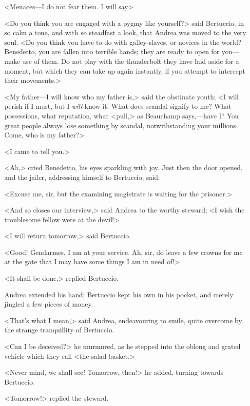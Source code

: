  <Menaces—I do not fear them. I will say\longdash> 

 <Do you think you are engaged with a pygmy like yourself?> said Bertuccio, in so calm a tone, and with so steadfast a look, that Andrea was moved to the very soul. <Do you think you have to do with galley-slaves, or novices in the world? Benedetto, you are fallen into terrible hands; they are ready to open for you—make use of them. Do not play with the thunderbolt they have laid aside for a moment, but which they can take up again instantly, if you attempt to intercept their movements.>  
 
<My father—I will know who my father is,> said the obstinate youth; <I will perish if I must, but I \textit{will} know it. What does scandal signify to me? What possessions, what reputation, what <pull,> as Beauchamp says,—have I? You great people always lose something by scandal, notwithstanding your millions. Come, who is my father?> 

 <I came to tell you.> 

 <Ah,> cried Benedetto, his eyes sparkling with joy. Just then the door opened, and the jailer, addressing himself to Bertuccio, said: 

 <Excuse me, sir, but the examining magistrate is waiting for the prisoner.> 

 <And so closes our interview,> said Andrea to the worthy steward; <I wish the troublesome fellow were at the devil!> 

 <I will return tomorrow,> said Bertuccio. 

 <Good! Gendarmes, I am at your service. Ah, sir, do leave a few crowns for me at the gate that I may have some things I am in need of!> 

 <It shall be done,> replied Bertuccio. 

 Andrea extended his hand; Bertuccio kept his own in his pocket, and merely jingled a few pieces of money. 

 <That's what I mean,> said Andrea, endeavouring to smile, quite overcome by the strange tranquillity of Bertuccio. 

 <Can I be deceived?> he murmured, as he stepped into the oblong and grated vehicle which they call <the salad basket.> 

 <Never mind, we shall see! Tomorrow, then!> he added, turning towards Bertuccio. 

 <Tomorrow!> replied the steward. 